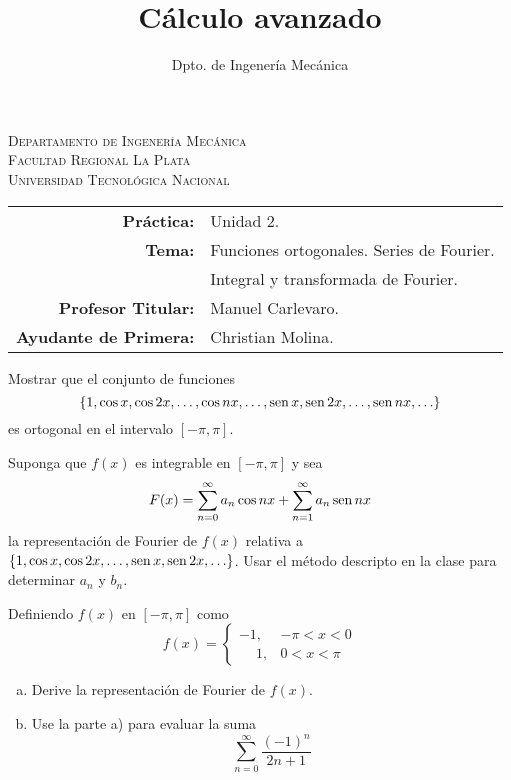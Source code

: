 \documentclass[11pt]{article}
\title{Cálculo avanzado}
\author{Dpto. de Ingenería Mecánica}
\begin{document}
\begin{center}
\end{center}

\begin{center}
	\vspace{\baselineskip}
	\Large{\textsc{Departamento de Ingenería Mecánica}} \\
	\textsc{Facultad Regional La Plata} \\
	\textsc{Universidad Tecnológica Nacional}
\end{center}


\begin{center}
	\begin{tabular}{r l}
		\textbf{Práctica:}            & Unidad 2.                                 \\
		\textbf{Tema:}                & Funciones ortogonales. Series de Fourier. \\
		                              & Integral y transformada de Fourier.       \\
		\textbf{Profesor Titular:}    & Manuel Carlevaro.                         \\
		\textbf{Ayudante de Primera:} & Christian Molina.
	\end{tabular}\end{center}

\vspace{1em}

\begin{question} %
	Mostrar que el conjunto de funciones
	\[ \{1 , \cos x, \cos 2x, \ldots, \cos nx, \ldots, \operatorname{sen} x, \operatorname{sen} 2x, \ldots, \operatorname{sen} nx, \ldots \} \]
	es ortogonal en el intervalo $[-\pi, \pi]$.
\end{question}

\begin{question} %
	Suponga que $f(x)$ es integrable en $[-\pi, \pi]$ y sea
	\[ F(x) = \sum_{n = 0}^{\infty} a_n \cos nx + \sum_{n = 1}^{\infty} a_n \operatorname{sen} nx \]
	la representación de Fourier de $f(x)$ relativa a $\{1, \cos x, \cos 2x, \ldots, \operatorname{sen} x, \operatorname{sen} 2x, \ldots \}$. Usar el método descripto en la clase para determinar $a_n$ y $b_n$.
\end{question}

\begin{question} %
	Definiendo $f(x)$ en $[-\pi, \pi]$ como
	\[ f(x) = \begin{cases}
			-1,           & -\pi < x < 0 \\
			\phantom{-}1, & 0 < x < \pi
		\end{cases} \]
	\begin{enumerate}[a)]
		\item Derive la representación de Fourier de $f(x)$.
		\item Use la parte a) para evaluar la suma
		      \[ \sum_{n = 0}^{\infty} \frac{(-1)^n}{2 n + 1} \]
	\end{enumerate}
\end{question}
\end{document}
